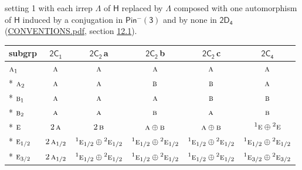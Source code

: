 \documentclass[10pt,a4paper]{article}
\numberwithin{equation}{section}
\newcommand{\grp}[1]{\mathsf{#1}}
\newcommand{\irr}[1]{\text{\normalfont\scshape #1}}
\newcommand{\conjpair}[1]{{}^{#1}}
\newcommand{\clsletter}[1]{\,{\scriptsize\color{black!55}#1}}
\begin{document}
setting 1 with each irrep $\Lambda$ of $\grp{H}$ replaced by $\Lambda$ composed with one automorphism of $\grp{H}$ induced by a conjugation in \href{Pinminus3.pdf}{$\grp{Pin^{-}(3)}$} and by none in $\grp{2D_{4}}$ (\href{../../CONVENTIONS.pdf}{CONVENTIONS.pdf}, section \href{../../../rotation/CONVENTIONS.pdf\#conv.12.1}{12.1}).
{\small\begin{longtable}{@{}lccccc@{}}\toprule
subgrp & \href{2C1.pdf}{$\grp{2C_{1}}$} & \href{2C2.pdf}{$\grp{2C_{2}}$}\clsletter{a} & \href{2C2.pdf}{$\grp{2C_{2}}$}\clsletter{b} & \href{2C2.pdf}{$\grp{2C_{2}}$}\clsletter{c} & \href{2C4.pdf}{$\grp{2C_{4}}$}\\\midrule\endhead
\bottomrule\endfoot\endlastfoot
$\irr{a}_{1}$ & $\irr{a}$ & $\irr{a}$ & $\irr{a}$ & $\irr{a}$ & $\irr{a}$\\*
$\irr{a}_{2}$ & $\irr{a}$ & $\irr{a}$ & $\irr{b}$ & $\irr{b}$ & $\irr{a}$\\*
$\irr{b}_{1}$ & $\irr{a}$ & $\irr{a}$ & $\irr{a}$ & $\irr{b}$ & $\irr{b}$\\*
$\irr{b}_{2}$ & $\irr{a}$ & $\irr{a}$ & $\irr{b}$ & $\irr{a}$ & $\irr{b}$\\*
$\irr{e}$ & $2\,\irr{a}$ & $2\,\irr{b}$ & $\irr{a}\oplus \irr{b}$ & $\irr{a}\oplus \irr{b}$ & $\conjpair{1}\irr{e}\oplus \conjpair{2}\irr{e}$\\*
$\irr{e}_{1/2}$ & $2\,\irr{a}_{1/2}$ & $\conjpair{1}\irr{e}_{1/2}\oplus \conjpair{2}\irr{e}_{1/2}$ & $\conjpair{1}\irr{e}_{1/2}\oplus \conjpair{2}\irr{e}_{1/2}$ & $\conjpair{1}\irr{e}_{1/2}\oplus \conjpair{2}\irr{e}_{1/2}$ & $\conjpair{1}\irr{e}_{1/2}\oplus \conjpair{2}\irr{e}_{1/2}$\\*
$\irr{e}_{3/2}$ & $2\,\irr{a}_{1/2}$ & $\conjpair{1}\irr{e}_{1/2}\oplus \conjpair{2}\irr{e}_{1/2}$ & $\conjpair{1}\irr{e}_{1/2}\oplus \conjpair{2}\irr{e}_{1/2}$ & $\conjpair{1}\irr{e}_{1/2}\oplus \conjpair{2}\irr{e}_{1/2}$ & $\conjpair{1}\irr{e}_{3/2}\oplus \conjpair{2}\irr{e}_{3/2}$\\
\bottomrule\end{longtable}}
\end{document}
